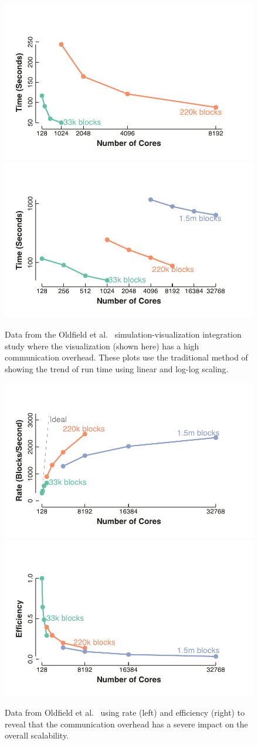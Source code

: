 \documentclass{llncs}
\newcommand*{\scite}[1]{~\cite{#1}}
\newcommand{\etal}{et al.\xspace}
\begin{document}
\begin{figure}[htb]
  \centering
  \includegraphics[width=.48\linewidth]{images/OldfieldTimeLinear}
  \includegraphics[width=.48\linewidth]{images/OldfieldTimeLog}
  \caption{Data from the Oldfield \etal\scite{Oldfield2014}
    simulation-visualization integration study where the visualization
    (shown here) has a high communication overhead. These plots use the
    traditional method of showing the trend of run time using linear and
    log-log scaling.}
  \label{fig:OldfieldTraditional}
\end{figure}

\begin{figure}
  \centering
  \includegraphics[width=.48\linewidth]{images/OldfieldRate}\quad
  \includegraphics[width=.48\linewidth]{images/OldfieldEfficiency}
  \caption{Data from Oldfield \etal\scite{Oldfield2014} using
    rate (left) and efficiency (right) to reveal that the communication
    overhead has a severe impact on the overall scalability.}
  \label{fig:OldfieldBetter}
\end{figure}
\end{document}

